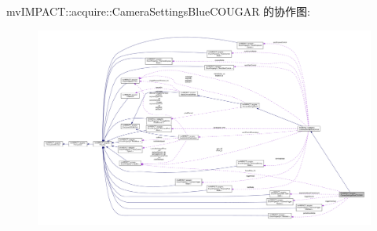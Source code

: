 mv\+I\+M\+P\+A\+C\+T\+:\+:acquire\+:\+:Camera\+Settings\+Blue\+C\+O\+U\+G\+A\+R 的协作图\+:
\nopagebreak
\begin{figure}[H]
\begin{center}
\leavevmode
\includegraphics[width=350pt]{classmv_i_m_p_a_c_t_1_1acquire_1_1_camera_settings_blue_c_o_u_g_a_r__coll__graph}
\end{center}
\end{figure}
